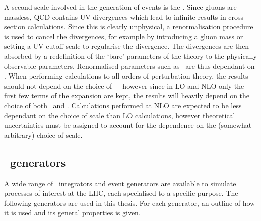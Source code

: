 A second scale involved in the generation of events is the
. Since gluons are massless, QCD contains UV
divergences which lead to infinite results in cross-section calculations. Since 
this is clearly unphysical, a renormalisation procedure is used to cancel the
divergences, for example by introducing a gluon mass or setting a UV cutoff
scale to regularise the divergence. The divergences are then absorbed by a
redefinition of the `bare' parameters of the theory to the physically observable
parameters. Renormalised parameters such as \alphaS\ are thus dependant on \uR.
When performing calculations to all orders of perturbation theory,  the results
should not depend on the choice of \uR\ - however since in LO and NLO only the
first few terms of the expansion are kept, the results will heavily depend on
the choice of both \uR\ and \uF. Calculations performed at NLO are expected to
be less dependant on the choice of scale than LO calculations, however
theoretical uncertainties must be assigned to account for the dependence on the
(somewhat arbitrary) choice of scale.

\subsection{\mc\ generators}
\label{sec:Theory-MC-gen}

A wide range of \mc\ integrators and event generators are available to simulate
processes of interest at the LHC, each specialised to a specific purpose. The
following generators are used in this thesis. For each generator, an outline of
how it is used and its general properties is given.

